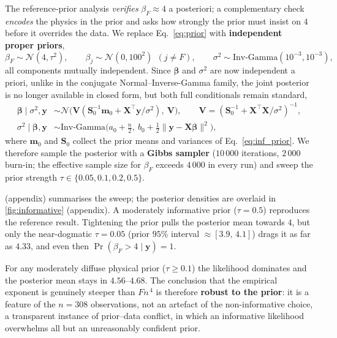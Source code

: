 \documentclass[12pt,a4paper]{article}
\begin{document}
The reference-prior analysis \emph{verifies} $\beta_F\approx4$ a posteriori; a complementary check \emph{encodes} the physics in the prior and asks how strongly the prior must insist on $4$ before it overrides the data. We replace Eq.~\eqref{eq:prior} with \textbf{independent proper priors},
\begin{equation}
	\beta_F \sim \mathcal{N}(4,\tau^2),
	\qquad
	\beta_j \sim \mathcal{N}(0,100^2)\ \ (j\neq F),
	\qquad
	\sigma^2 \sim \text{Inv-Gamma}(10^{-3},10^{-3}),
	\label{eq:inf_prior}
\end{equation}
all components mutually independent. Since $\bm{\beta}$ and $\sigma^2$ are now independent a priori, unlike in the conjugate Normal--Inverse-Gamma family, the joint posterior is no longer available in closed form, but both full conditionals remain standard,
\begin{align}
	\bm{\beta}\mid\sigma^{2},\bm{y} & \sim \mathcal{N}\!\big(\bm{V}(\bm{S}_0^{-1}\bm{m}_0+\bm{X}^{\!\top}\bm{y}/\sigma^{2}),\ \bm{V}\big),
	\qquad \bm{V}=(\bm{S}_0^{-1}+\bm{X}^{\!\top}\bm{X}/\sigma^{2})^{-1}, \label{eq:fc_beta}                                                                            \\
	\sigma^{2}\mid\bm{\beta},\bm{y} & \sim \text{Inv-Gamma}\!\big(a_0+\tfrac{n}{2},\ b_0+\tfrac{1}{2}\lVert\bm{y}-\bm{X}\bm{\beta}\rVert^{2}\big), \label{eq:fc_sigma}
\end{align}
where $\bm{m}_0$ and $\bm{S}_0$ collect the prior means and variances of Eq.~\eqref{eq:inf_prior}. We therefore sample the posterior with a \textbf{Gibbs sampler} ($10\,000$ iterations, $2\,000$ burn-in; the effective sample size for $\beta_F$ exceeds $4\,000$ in every run) and sweep the prior strength $\tau\in\{0.05,0.1,0.2,0.5\}$.

 (appendix) summarises the sweep; the posterior densities are overlaid in \cref{fig:informative} (appendix). A moderately informative prior ($\tau=0.5$) reproduces the reference result. Tightening the prior pulls the posterior mean towards $4$, but only the near-dogmatic $\tau=0.05$ (prior $95\%$ interval $\approx[3.9,\,4.1]$) drags it as far as $4.33$, and even then $\Pr(\beta_F>4\mid\bm{y})=1$.

For any moderately diffuse physical prior ($\tau\ge0.1$) the likelihood dominates and the posterior mean stays in $4.56$--$4.68$. The conclusion that the empirical exponent is genuinely steeper than $Fn^{\,4}$ is therefore \textbf{robust to the prior}: it is a feature of the $n=308$ observations, not an artefact of the non-informative choice, a transparent instance of prior--data conflict, in which an informative likelihood overwhelms all but an unreasonably confident prior.
\end{document}
